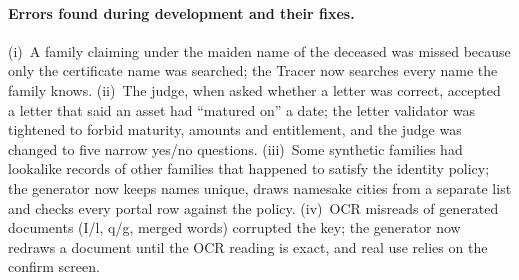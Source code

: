 \paragraph{Errors found during development and their fixes.} (i)~A family claiming under the maiden name of the deceased was missed because only the certificate name was searched; the Tracer now searches every name the family knows. (ii)~The judge, when asked whether a letter was correct, accepted a letter that said an asset had ``matured on'' a date; the letter validator was tightened to forbid maturity, amounts and entitlement, and the judge was changed to five narrow yes/no questions. (iii)~Some synthetic families had lookalike records of other families that happened to satisfy the identity policy; the generator now keeps names unique, draws namesake cities from a separate list and checks every portal row against the policy. (iv)~OCR misreads of generated documents (I/l, q/g, merged words) corrupted the key; the generator now redraws a document until the OCR reading is exact, and real use relies on the confirm screen.
